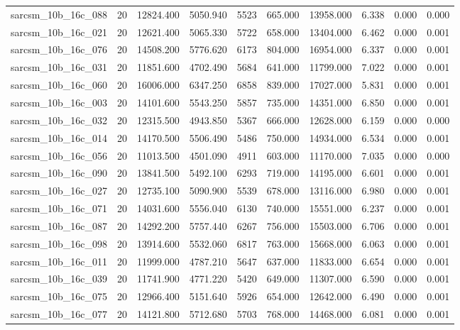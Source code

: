 \begin{tabular}{lrrrrrrrrr}
sarcsm\_10b\_16c\_088 & 20 & 12824.400 & 5050.940 & 5523 & 665.000 & 13958.000 & 6.338 & 0.000 & 0.000 \\
sarcsm\_10b\_16c\_021 & 20 & 12621.400 & 5065.330 & 5722 & 658.000 & 13404.000 & 6.462 & 0.000 & 0.001 \\
sarcsm\_10b\_16c\_076 & 20 & 14508.200 & 5776.620 & 6173 & 804.000 & 16954.000 & 6.337 & 0.000 & 0.001 \\
sarcsm\_10b\_16c\_031 & 20 & 11851.600 & 4702.490 & 5684 & 641.000 & 11799.000 & 7.022 & 0.000 & 0.001 \\
sarcsm\_10b\_16c\_060 & 20 & 16006.000 & 6347.250 & 6858 & 839.000 & 17027.000 & 5.831 & 0.000 & 0.001 \\
sarcsm\_10b\_16c\_003 & 20 & 14101.600 & 5543.250 & 5857 & 735.000 & 14351.000 & 6.850 & 0.000 & 0.001 \\
sarcsm\_10b\_16c\_032 & 20 & 12315.500 & 4943.850 & 5367 & 666.000 & 12628.000 & 6.159 & 0.000 & 0.000 \\
sarcsm\_10b\_16c\_014 & 20 & 14170.500 & 5506.490 & 5486 & 750.000 & 14934.000 & 6.534 & 0.000 & 0.001 \\
sarcsm\_10b\_16c\_056 & 20 & 11013.500 & 4501.090 & 4911 & 603.000 & 11170.000 & 7.035 & 0.000 & 0.000 \\
sarcsm\_10b\_16c\_090 & 20 & 13841.500 & 5492.100 & 6293 & 719.000 & 14195.000 & 6.601 & 0.000 & 0.001 \\
sarcsm\_10b\_16c\_027 & 20 & 12735.100 & 5090.900 & 5539 & 678.000 & 13116.000 & 6.980 & 0.000 & 0.001 \\
sarcsm\_10b\_16c\_071 & 20 & 14031.600 & 5556.040 & 6130 & 740.000 & 15551.000 & 6.237 & 0.000 & 0.001 \\
sarcsm\_10b\_16c\_087 & 20 & 14292.200 & 5757.440 & 6267 & 756.000 & 15503.000 & 6.706 & 0.000 & 0.001 \\
sarcsm\_10b\_16c\_098 & 20 & 13914.600 & 5532.060 & 6817 & 763.000 & 15668.000 & 6.063 & 0.000 & 0.001 \\
sarcsm\_10b\_16c\_011 & 20 & 11999.000 & 4787.210 & 5647 & 637.000 & 11833.000 & 6.654 & 0.000 & 0.001 \\
sarcsm\_10b\_16c\_039 & 20 & 11741.900 & 4771.220 & 5420 & 649.000 & 11307.000 & 6.590 & 0.000 & 0.001 \\
sarcsm\_10b\_16c\_075 & 20 & 12966.400 & 5151.640 & 5926 & 654.000 & 12642.000 & 6.490 & 0.000 & 0.001 \\
sarcsm\_10b\_16c\_077 & 20 & 14121.800 & 5712.680 & 5703 & 768.000 & 14468.000 & 6.081 & 0.000 & 0.001 \\

\end{tabular}
